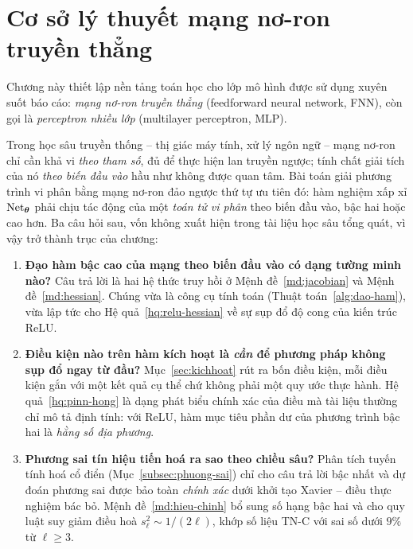 \chapter{Cơ sở lý thuyết mạng nơ-ron truyền thẳng}
\label{chap:fnn}
 
Chương này thiết lập nền tảng toán học cho lớp mô hình được sử dụng xuyên suốt
báo cáo: \emph{mạng nơ-ron truyền thẳng} (feedforward neural network, FNN), còn
gọi là \emph{perceptron nhiều lớp} (multilayer perceptron, MLP).
 
Trong học sâu truyền thống -- thị giác máy tính, xử lý ngôn ngữ -- mạng nơ-ron
chỉ cần khả vi \emph{theo tham số}, đủ để thực hiện lan truyền ngược; tính chất
giải tích của nó \emph{theo biến đầu vào} hầu như không được quan tâm. Bài toán
giải phương trình vi phân bằng mạng nơ-ron đảo ngược thứ tự ưu tiên đó: hàm
nghiệm xấp xỉ $\operatorname{Net}_{\bm{\theta}}$ phải chịu tác động của một \emph{toán tử vi phân}
theo biến đầu vào, bậc hai hoặc cao hơn. Ba câu hỏi sau, vốn không xuất hiện
trong tài liệu học sâu tổng quát, vì vậy trở thành trục của chương:
 
\begin{enumerate}[label=(\Alph*), leftmargin=*]
\item \textbf{Đạo hàm bậc cao của mạng theo biến đầu vào có dạng tường minh
      nào?} Câu trả lời là hai hệ thức truy hồi ở Mệnh đề~\ref{md:jacobian} và
      Mệnh đề~\ref{md:hessian}. Chúng vừa là công cụ tính toán (Thuật
      toán~\ref{alg:dao-ham}), vừa lập tức cho Hệ quả~\ref{hq:relu-hessian} về
      sự sụp đổ độ cong của kiến trúc ReLU.
\item \textbf{Điều kiện nào trên hàm kích hoạt là \emph{cần} để phương pháp
      không sụp đổ ngay từ đầu?} Mục~\ref{sec:kichhoat} rút ra bốn điều kiện,
      mỗi điều kiện gắn với một kết quả cụ thể chứ không phải một quy ước thực
      hành. Hệ quả~\ref{hq:pinn-hong} là dạng phát biểu chính xác của điều mà
      tài liệu thường chỉ mô tả định tính: với ReLU, hàm mục tiêu phần dư của
      phương trình bậc hai là \emph{hằng số địa phương}.
\item \textbf{Phương sai tín hiệu tiến hoá ra sao theo chiều sâu?} Phân tích
      tuyến tính hoá cổ điển (Mục~\ref{subsec:phuong-sai}) chỉ cho câu trả lời
      bậc nhất và dự đoán phương sai được bảo toàn \emph{chính xác} dưới khởi
      tạo Xavier -- điều thực nghiệm bác bỏ. Mệnh đề~\ref{md:hieu-chinh} bổ sung
      số hạng bậc hai và cho quy luật suy giảm điều hoà
      $s_\ell^2 \sim 1/(2\ell)$, khớp số liệu TN-C với sai số dưới $9\%$ từ
      $\ell \ge 3$.
\end{enumerate}
 
